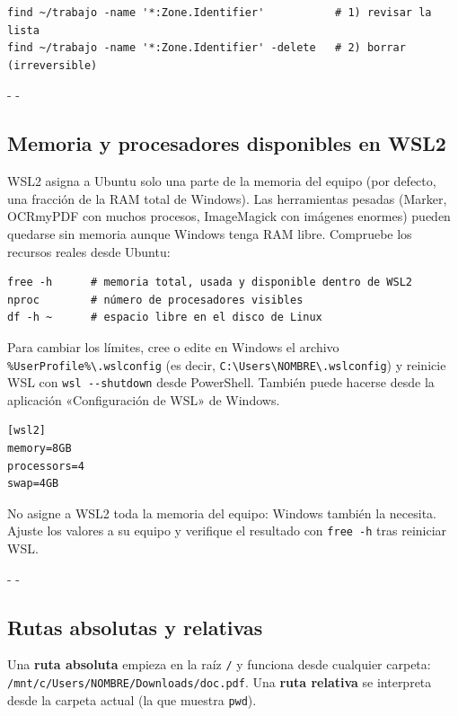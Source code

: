 \documentclass[11pt,a4paper]{article}
\makeatletter
\newcommand{\necesitaespacio}[1]{\par\penalty-100\begingroup
	\setlength{\dimen@}{#1}\dimen@ii\pagegoal\advance\dimen@ii-\pagetotal
	\ifdim\dimen@>\dimen@ii\ifdim\dimen@ii>\z@\vfil\fi\penalty-\@M\fi\endgroup}
\newcommand{\cmd}[1]{\texttt{\textcolor{colcmd}{#1}}}      %
\newcommand{\arch}[1]{\texttt{\textcolor{colarch}{#1}}}    %
\newcommand{\bs}{\textbackslash{}}    %
\makeatother
\begin{document}
	\begin{lstlisting}
find ~/trabajo -name '*:Zone.Identifier'           # 1) revisar la lista
find ~/trabajo -name '*:Zone.Identifier' -delete   # 2) borrar (irreversible)
\end{lstlisting}
	
	\necesitaespacio{8\baselineskip}
	\subsection{Memoria y procesadores disponibles en WSL2}\label{sec:wsl-memoria}
	
	WSL2 asigna a Ubuntu solo una parte de la memoria del equipo (por defecto, una fracción de la RAM total de Windows). Las herramientas pesadas (Marker, OCRmyPDF con muchos procesos, ImageMagick con imágenes enormes) pueden quedarse sin memoria aunque Windows tenga RAM libre. Compruebe los recursos reales desde Ubuntu:
	
	\begin{lstlisting}
free -h      # memoria total, usada y disponible dentro de WSL2
nproc        # número de procesadores visibles
df -h ~      # espacio libre en el disco de Linux
\end{lstlisting}
	
	Para cambiar los límites, cree o edite en Windows el archivo \arch{\%UserProfile\%\bs{}\allowbreak{}.wslconfig} (es decir, \arch{C:\bs{}\allowbreak{}Users\bs{}\allowbreak{}NOMBRE\bs{}\allowbreak{}.wslconfig}) y reinicie WSL con \cmd{wsl -{}-shutdown} desde PowerShell. También puede hacerse desde la aplicación «Configuración de WSL» de Windows.
	\newpage
	
	\begin{lstlisting}[style=salida]
[wsl2]
memory=8GB
processors=4
swap=4GB
\end{lstlisting}
	
	\begin{advertencia}
		No asigne a WSL2 toda la memoria del equipo: Windows también la necesita. Ajuste los valores a su equipo y verifique el resultado con \cmd{free -h} tras reiniciar WSL.
	\end{advertencia}
	
	\necesitaespacio{17\baselineskip}
	\subsection{Rutas absolutas y relativas}
	
	Una \textbf{ruta absoluta} empieza en la raíz \arch{/} y funciona desde cualquier carpeta: \arch{/\allowbreak{}mnt/\allowbreak{}c/\allowbreak{}Users/\allowbreak{}NOMBRE/\allowbreak{}Downloads/\allowbreak{}doc.pdf}. Una \textbf{ruta relativa} se interpreta desde la carpeta actual (la que muestra \cmd{pwd}).
	
\end{document}
